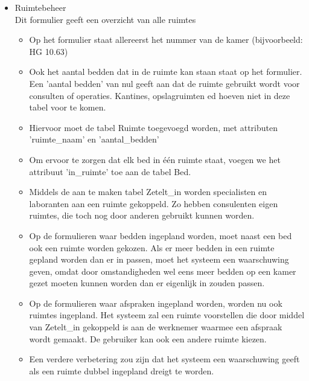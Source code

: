 \documentclass[10pt,twoside]{report}
\begin{document}
\begin{itemize}
\item Ruimtebeheer\\
Dit formulier geeft een overzicht van alle ruimtes
    \begin{itemize}
    \item Op het formulier staat allereerst het nummer van de kamer (bijvoorbeeld: HG 10.63)
    \item Ook het aantal bedden dat in de ruimte kan staan staat op het formulier. Een 'aantal bedden' van nul geeft aan dat de ruimte gebruikt wordt voor consulten of operaties. Kantines, opslagruimten ed hoeven niet in deze tabel voor te komen.
    \item Hiervoor moet de tabel Ruimte toegevoegd worden, met attributen 'ruimte\_naam' en 'aantal\_bedden'
    \item Om ervoor te zorgen dat elk bed in \'e\'en ruimte staat, voegen we het attribuut 'in\_ruimte' toe aan de tabel Bed.
    \item Middels de aan te maken tabel Zetelt\_in worden specialisten en laboranten aan een ruimte gekoppeld. Zo hebben consulenten eigen ruimtes, die toch nog door anderen gebruikt kunnen worden.
    \item Op de formulieren waar bedden ingepland worden, moet naast een bed ook een ruimte worden gekozen. Als er meer bedden in een ruimte gepland worden dan er in passen, moet het systeem een waarschuwing geven, omdat door omstandigheden wel eens meer bedden op een kamer gezet moeten kunnen worden dan er eigenlijk in zouden passen.
    \item Op de formulieren waar afspraken ingepland worden, worden nu ook ruimtes ingepland. Het systeem zal een ruimte voorstellen die door middel van Zetelt\_in gekoppeld is aan de werknemer waarmee een afspraak wordt gemaakt. De gebruiker kan ook een andere ruimte kiezen.
    \item Een verdere verbetering zou zijn dat het systeem een waarschuwing geeft als een ruimte dubbel ingepland dreigt te worden.
    \end{itemize}

\end{itemize}
\end{document}
